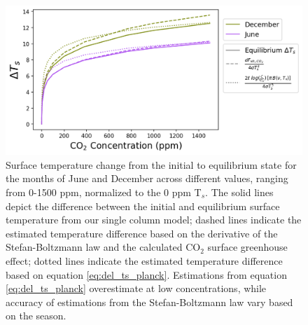 \documentclass[draft]{agujournal2019}
\begin{document}
\begin{figure}[htb!]
\noindent\includegraphics[width=1\textwidth]{figures/delta_Ts.png}
\centering
\caption{Surface temperature change from the initial to equilibrium state for the months of June and December across different  values, ranging from 0-1500 ppm, normalized to the 0 ppm T$_s$. The solid lines depict the difference between the initial and equilibrium surface temperature from our single column model; dashed lines indicate the estimated temperature difference based on the derivative of the Stefan-Boltzmann law and the calculated CO$_2$ surface greenhouse effect; dotted lines indicate the estimated temperature difference based on equation \ref{eq:del_ts_planck}. Estimations from equation \ref{eq:del_ts_planck} overestimate at low  concentrations, while accuracy of estimations from the Stefan-Boltzmann law vary based on the season.}
\label{fig:delta_ts}
\end{figure}


\end{document}
